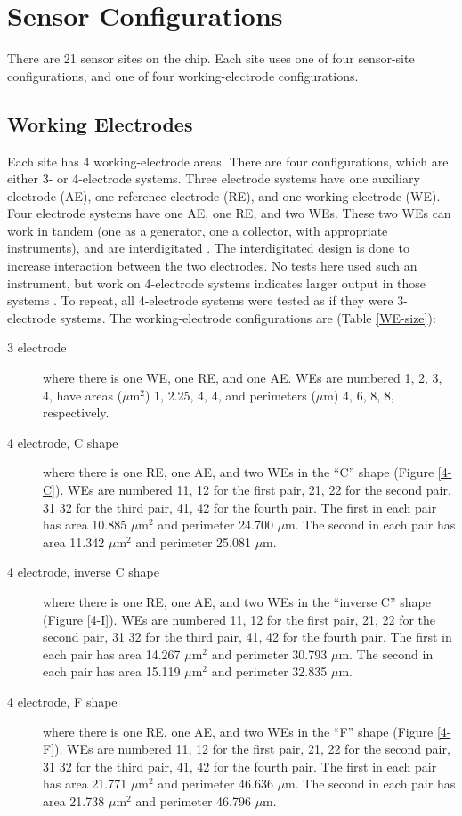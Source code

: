 \section{Sensor Configurations}

There are 21 sensor sites on the chip. Each site uses one of four sensor-site configurations, and one of four working-electrode configurations.

\subsection{Working Electrodes}

Each site has 4 working-electrode areas. There are four configurations, which are either 3- or 4-electrode systems. Three electrode systems have one auxiliary electrode (AE), one reference electrode (RE), and one working electrode (WE). Four electrode systems have one AE, one RE, and two WEs. These two WEs can work in tandem (one as a generator, one a collector, with appropriate instruments), and are interdigitated \cite{frey2003dip}. The interdigitated design is done to increase interaction between the two electrodes. No tests here used such an instrument, but work on 4-electrode systems indicates larger output in those systems \cite{iwasaki1995emi}. To repeat, all 4-electrode systems were tested as if they were 3-electrode systems. The working-electrode configurations are (Table \ref{WE-size}):

\begin{description}
\item[3 electrode] where there is one WE, one RE, and one AE. WEs are numbered 1, 2, 3, 4, have areas ($\mu \mathrm{m}^2$) 1, 2.25, 4, 4, and perimeters ($\mu \mathrm{m}$) 4, 6, 8, 8, respectively.
\item[4 electrode, C shape] where there is one RE, one AE, and two WEs in the ``C'' shape (Figure \ref{4-C}). WEs are numbered 11, 12 for the first pair, 21, 22 for the second pair, 31 32 for the third pair, 41, 42 for the fourth pair. The first in each pair has area 10.885 $\mu \mathrm{m}^2$ and perimeter 24.700 $\mu \mathrm{m}$. The second in each pair has area 11.342 $\mu \mathrm{m}^2$ and perimeter 25.081 $\mu \mathrm{m}$.
\item[4 electrode, inverse C shape] where there is one RE, one AE, and two WEs in the ``inverse C'' shape (Figure \ref{4-I}). WEs are numbered 11, 12 for the first pair, 21, 22 for the second pair, 31 32 for the third pair, 41, 42 for the fourth pair. The first in each pair has area 14.267 $\mu \mathrm{m}^2$ and perimeter 30.793 $\mu \mathrm{m}$. The second in each pair has area 15.119 $\mu \mathrm{m}^2$ and perimeter 32.835 $\mu \mathrm{m}$.
\item[4 electrode, F shape] where there is one RE, one AE, and two WEs in the ``F'' shape (Figure \ref{4-F}). WEs are numbered 11, 12 for the first pair, 21, 22 for the second pair, 31 32 for the third pair, 41, 42 for the fourth pair. The first in each pair has area 21.771 $\mu \mathrm{m}^2$ and perimeter 46.636 $\mu \mathrm{m}$. The second in each pair has area 21.738 $\mu \mathrm{m}^2$ and perimeter 46.796 $\mu \mathrm{m}$.
\end{description}

